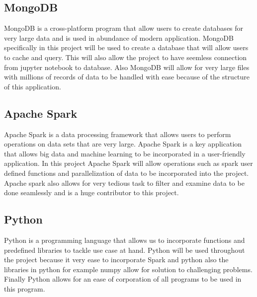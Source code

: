 \documentclass[conference,twoside]{IEEEtran}
\begin{document}
\subsection{MongoDB}
	MongoDB is a cross-platform program that allow users to create databases for very large data and is used in abundance of modern application. MongoDB specifically in this project will be used to create a database that will allow users to cache and query. This will also allow the project to have seemless connection from jupyter notebook to database. Also MongoDB will allow for very large files with millions of records of data to be handled with ease because of the structure of this application.


\subsection{Apache Spark}
	Apache Spark is a data processing framework that allows users to perform operations on data sets that are very large. Apache Spark is a key application that allows big data and machine learning to be incorporated in a user-friendly application. In this project Apache Spark will allow operations such as spark user defined functions and parallelization of data to be incorporated into the project. Apache spark also allows for very tedious task to filter and examine data to be done seamlessly and is a huge contributor to this project.


\subsection{Python}
	Python is a programming language that allows us to incorporate functions and predefined libraries to tackle use case at hand. Python will be used throughout the project because it very ease to incorporate Spark and python also the libraries in python for example numpy allow for solution to challenging problems. Finally Python allows for an ease of corporation of all programs to be used in this program.
\end{document}
